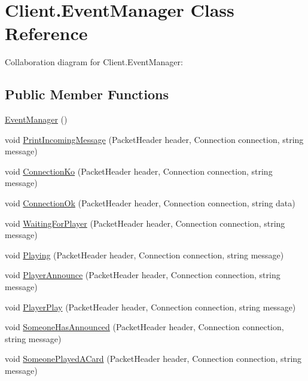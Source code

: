 \hypertarget{class_client_1_1_event_manager}{}\section{Client.\+Event\+Manager Class Reference}
\label{class_client_1_1_event_manager}


Collaboration diagram for Client.\+Event\+Manager\+:
\subsection*{Public Member Functions}
\begin{DoxyCompactItemize}
\item 
\hyperlink{class_client_1_1_event_manager_afa1fe29f61e7329ba985dfb8c2627b36}{Event\+Manager} ()
\item 
void \hyperlink{class_client_1_1_event_manager_ad850af88bc9fe2c1e31824171921fc4a}{Print\+Incoming\+Message} (Packet\+Header header, Connection connection, string message)
\item 
void \hyperlink{class_client_1_1_event_manager_a864e511bd02284159cba1cf1b0b31cf7}{Connection\+Ko} (Packet\+Header header, Connection connection, string message)
\item 
void \hyperlink{class_client_1_1_event_manager_a4fca9a8ae6010251ba07265e9f8572ac}{Connection\+Ok} (Packet\+Header header, Connection connection, string data)
\item 
void \hyperlink{class_client_1_1_event_manager_aae08d4b92f94038ac4934880fdbb9356}{Waiting\+For\+Player} (Packet\+Header header, Connection connection, string message)
\item 
void \hyperlink{class_client_1_1_event_manager_a53596e2ebf7de8a3d5fe42ca9a020b67}{Playing} (Packet\+Header header, Connection connection, string message)
\item 
void \hyperlink{class_client_1_1_event_manager_abd1cce780860d17af587ba718c07d33a}{Player\+Announce} (Packet\+Header header, Connection connection, string message)
\item 
void \hyperlink{class_client_1_1_event_manager_a11c5ad80334ca0d83551fddb47194589}{Player\+Play} (Packet\+Header header, Connection connection, string message)
\item 
void \hyperlink{class_client_1_1_event_manager_a65536bbfa18b0aaf02bf0a4dd1f6c1a0}{Someone\+Has\+Announced} (Packet\+Header header, Connection connection, string message)
\item 
void \hyperlink{class_client_1_1_event_manager_a55922c9feb080ebff89d86fa757d3880}{Someone\+Played\+A\+Card} (Packet\+Header header, Connection connection, string message)

\end{DoxyCompactItemize}
